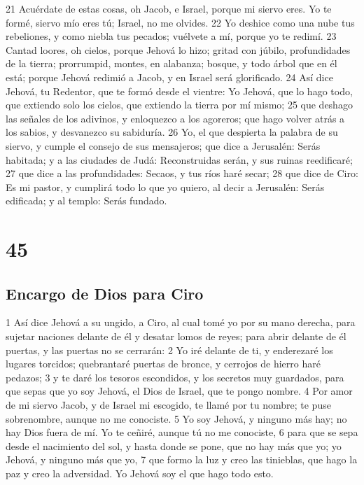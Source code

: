 21 Acuérdate de estas cosas, oh Jacob, e Israel, porque mi siervo eres. Yo te formé, siervo mío eres tú; Israel, no me olvides.
22 Yo deshice como una nube tus rebeliones, y como niebla tus pecados; vuélvete a mí, porque yo te redimí.
23 Cantad loores, oh cielos, porque Jehová lo hizo; gritad con júbilo, profundidades de la tierra; prorrumpid, montes, en alabanza; bosque, y todo árbol que en él está; porque Jehová redimió a Jacob, y en Israel será glorificado.
24 Así dice Jehová, tu Redentor, que te formó desde el vientre: Yo Jehová, que lo hago todo, que extiendo solo los cielos, que extiendo la tierra por mí mismo;
25 que deshago las señales de los adivinos, y enloquezco a los agoreros; que hago volver atrás a los sabios, y desvanezco su sabiduría. 
26 Yo, el que despierta la palabra de su siervo, y cumple el consejo de sus mensajeros; que dice a Jerusalén: Serás habitada; y a las ciudades de Judá: Reconstruidas serán, y sus ruinas reedificaré;
27 que dice a las profundidades: Secaos, y tus ríos haré secar;
28 que dice de Ciro: Es mi pastor, y cumplirá todo lo que yo quiero, al decir a Jerusalén: Serás edificada; y al templo: Serás fundado.

\chapter{45}

\section*{Encargo de Dios para Ciro}

1 Así dice Jehová a su ungido, a Ciro, al cual tomé yo por su mano derecha, para sujetar naciones delante de él y desatar lomos de reyes; para abrir delante de él puertas, y las puertas no se cerrarán:
2 Yo iré delante de ti, y enderezaré los lugares torcidos; quebrantaré puertas de bronce, y cerrojos de hierro haré pedazos;
3 y te daré los tesoros escondidos, y los secretos muy guardados, para que sepas que yo soy Jehová, el Dios de Israel, que te pongo nombre.
4 Por amor de mi siervo Jacob, y de Israel mi escogido, te llamé por tu nombre; te puse sobrenombre, aunque no me conociste.
5 Yo soy Jehová, y ninguno más hay; no hay Dios fuera de mí. Yo te ceñiré, aunque tú no me conociste,
6 para que se sepa desde el nacimiento del sol, y hasta donde se pone, que no hay más que yo; yo Jehová, y ninguno más que yo,
7 que formo la luz y creo las tinieblas, que hago la paz y creo la adversidad. Yo Jehová soy el que hago todo esto.

